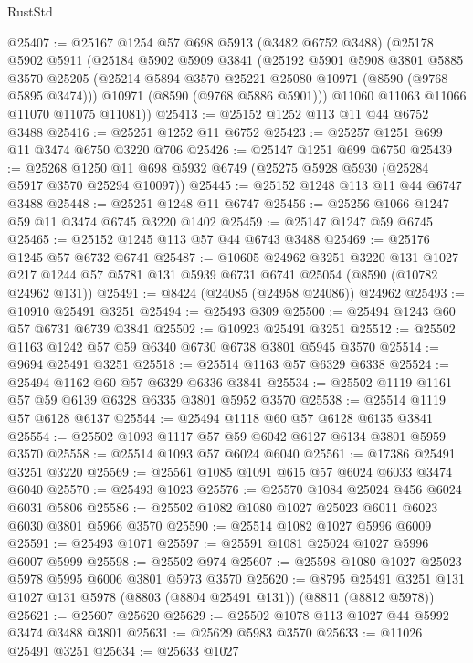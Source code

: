 \begin{lexlean}{RustStd}
\begin{coremodule}
@25407 := @25167
    @1254
    @57
    @698
    @5913
    (@3482 @6752 @3488)
    (@25178
      @5902
      @5911
      (@25184
        @5902
        @5909
        @3841
        (@25192
          @5901
          @5908
          @3801
          @5885
          @3570
          @25205
          (@25214 @5894 @3570 @25221 @25080 @10971 (@8590 (@9768 @5895 @3474)))
          @10971
          (@8590 (@9768 @5886 @5901)))
        @11060
        @11063
        @11066
        @11070
        @11075
        @11081))
@25413 := @25152 @1252 @113 @11 @44 @6752 @3488
@25416 := @25251 @1252 @11 @6752
@25423 := @25257 @1251 @699 @11 @3474 @6750 @3220 @706
@25426 := @25147 @1251 @699 @6750
@25439 := @25268 @1250 @11 @698 @5932 @6749 (@25275 @5928 @5930 (@25284 @5917 @3570 @25294 @10097))
@25445 := @25152 @1248 @113 @11 @44 @6747 @3488
@25448 := @25251 @1248 @11 @6747
@25456 := @25256 @1066 @1247 @59 @11 @3474 @6745 @3220 @1402
@25459 := @25147 @1247 @59 @6745
@25465 := @25152 @1245 @113 @57 @44 @6743 @3488
@25469 := @25176 @1245 @57 @6732 @6741
@25487 := @10605
    @24962
    @3251
    @3220
    @131
    @1027
    @217
    @1244
    @57
    @5781
    @131
    @5939
    @6731
    @6741
    @25054
    (@8590 (@10782 @24962 @131))
@25491 := @8424 (@24085 (@24958 @24086)) @24962
@25493 := @10910 @25491 @3251
@25494 := @25493 @309
@25500 := @25494 @1243 @60 @57 @6731 @6739 @3841
@25502 := @10923 @25491 @3251
@25512 := @25502 @1163 @1242 @57 @59 @6340 @6730 @6738 @3801 @5945 @3570
@25514 := @9694 @25491 @3251
@25518 := @25514 @1163 @57 @6329 @6338
@25524 := @25494 @1162 @60 @57 @6329 @6336 @3841
@25534 := @25502 @1119 @1161 @57 @59 @6139 @6328 @6335 @3801 @5952 @3570
@25538 := @25514 @1119 @57 @6128 @6137
@25544 := @25494 @1118 @60 @57 @6128 @6135 @3841
@25554 := @25502 @1093 @1117 @57 @59 @6042 @6127 @6134 @3801 @5959 @3570
@25558 := @25514 @1093 @57 @6024 @6040
@25561 := @17386 @25491 @3251 @3220
@25569 := @25561 @1085 @1091 @615 @57 @6024 @6033 @3474 @6040
@25570 := @25493 @1023
@25576 := @25570 @1084 @25024 @456 @6024 @6031 @5806
@25586 := @25502 @1082 @1080 @1027 @25023 @6011 @6023 @6030 @3801 @5966 @3570
@25590 := @25514 @1082 @1027 @5996 @6009
@25591 := @25493 @1071
@25597 := @25591 @1081 @25024 @1027 @5996 @6007 @5999
@25598 := @25502 @974
@25607 := @25598 @1080 @1027 @25023 @5978 @5995 @6006 @3801 @5973 @3570
@25620 := @8795 @25491 @3251 @131 @1027 @131 @5978 (@8803 (@8804 @25491 @131)) (@8811 (@8812 @5978))
@25621 := @25607 @25620
@25629 := @25502 @1078 @113 @1027 @44 @5992 @3474 @3488 @3801
@25631 := @25629 @5983 @3570
@25633 := @11026 @25491 @3251
@25634 := @25633 @1027

\end{coremodule}
\end{lexlean}
